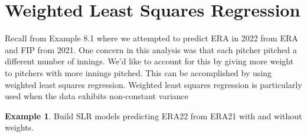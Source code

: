 \documentclass[
  11pt,
]{book}
\theoremstyle{definition}
\theoremstyle{definition}
\newtheorem{example}{Example}[chapter]
\theoremstyle{definition}
\theoremstyle{definition}
\theoremstyle{remark}
\begin{document}
\hypertarget{weighted-least-squares-regression}{%
\section{Weighted Least Squares Regression}\label{weighted-least-squares-regression}}

Recall from Example 8.1 where we attempted to predict ERA in 2022 from ERA and FIP from 2021. One concern in this analysis was that each pitcher pitched a different number of innings. We'd like to account for this by giving more weight to pitchers with more innings pitched. This can be accomplished by using weighted least squares regression. Weighted least squares regression is particularly used when the data exhibits non-constant variance

\begin{example}
Build SLR models predicting ERA22 from ERA21 with and without weights.
\end{example}
\end{document}
